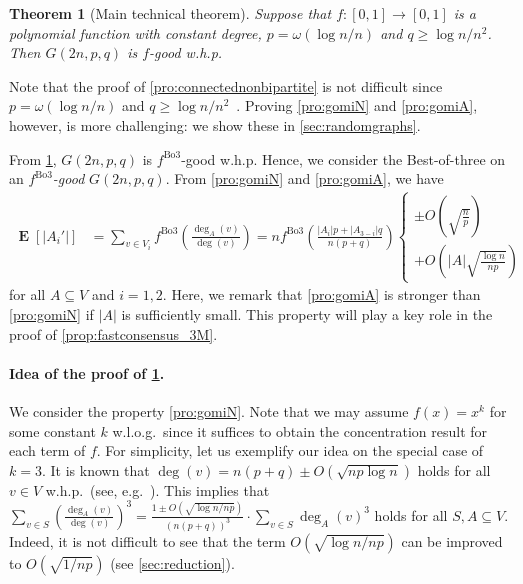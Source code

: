 \documentclass[letterpaper,11pt]{article}
\newtheorem{theorem}{Theorem}[section]
\newcommand{\Bthree}{\mathrm{Bo3}}
\DeclareMathOperator{\E}{\mathbf{E}}
\begin{document}
\begin{theorem}[Main technical theorem]
\label{thm:fgood}
Suppose that $f:[0,1]\to [0,1]$ is a polynomial function with constant degree, $p=\omega(\log n/n)$ and $q\geq \log n/n^2$. 
Then $G(2n,p,q)$ is $f$-good w.h.p.
\end{theorem}
Note that the proof of \ref{pro:connectednonbipartite} is not difficult since $p=\omega(\log n/n)$ and $q\geq \log n/n^2$~\cite{FK16}.
Proving \ref{pro:gomiN} and \ref{pro:gomiA}, however, is more challenging: we show these in \cref{sec:randomgraphs}.

From \cref{thm:fgood}, $G(2n,p,q)$ is $f^{\Bthree}$-good w.h.p.
Hence, we consider the Best-of-three on an {\em $f^{\Bthree}$-good} $G(2n,p,q)$.
From \ref{pro:gomiN} and \ref{pro:gomiA}, we have
\begin{align}
\E[|A_i'|]
&=\sum_{v\in V_i}f^{\Bthree}\left(\frac{\deg_A(v)}{\deg(v)}\right)
=nf^{\Bthree}\left(\frac{|A_i|p+|A_{3-i}|q}{n(p+q)} \right) 
\begin{cases}
\pm O\left(\sqrt{\frac{n}{p}}\right)\\
+O\left(|A|\sqrt{\frac{\log n}{np}}\right)
\end{cases}
\label{thm:mainthm_E}%
\end{align}
for all $A\subseteq V$ and $i=1,2$.
Here, we remark that \ref{pro:gomiA} is stronger than \ref{pro:gomiN} if $|A|$ is sufficiently small.
This property will play a key role in the proof of \cref{prop:fastconsensus_3M}.

\paragraph*{Idea of the proof of \cref{thm:fgood}.}
We consider the property \ref{pro:gomiN}.
Note that we may assume $f(x)=x^k$ for some constant $k$ w.l.o.g.~since it suffices to obtain the concentration result for each term of $f$.
For simplicity, let us exemplify our idea on the special case of $k=3$. %
It is known that $\deg(v)=n(p+q)\pm O(\sqrt{np\log n})$ holds for all $v\in V$ w.h.p.~(see, e.g.~\cite{FK16}).
This implies that $\sum_{v\in S}\left(\frac{\deg_A(v)}{\deg(v)}\right)^3 = \frac{1\pm O(\sqrt{\log n/np})}{(n(p+q))^3}\cdot \sum_{v\in S}\deg_A(v)^3$ holds for all $S,A\subseteq V$.
Indeed, it is not difficult to see that the term $O(\sqrt{\log n/np})$ can be improved to $O(\sqrt{1/np})$ (see \cref{sec:reduction}).
\end{document}
